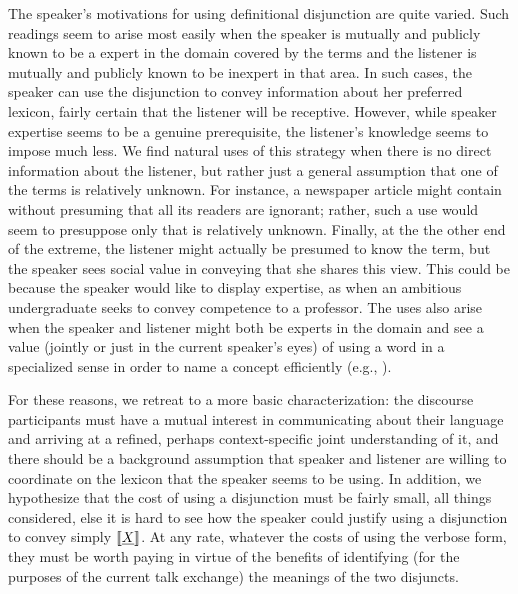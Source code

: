 \documentclass{article}
\begin{document}
The speaker's motivations for using definitional disjunction are quite
varied. Such readings seem to arise most easily when the speaker is
mutually and publicly known to be a expert in the domain covered by
the terms and the listener is mutually and publicly known to be
inexpert in that area. In such cases, the speaker can use the
disjunction to convey information about her preferred lexicon, fairly
certain that the listener will be receptive. However, while speaker
expertise seems to be a genuine prerequisite, the listener's knowledge
seems to impose much less.  We find natural uses of this strategy when
there is no direct information about the listener, but rather just a
general assumption that one of the terms is relatively unknown. For
instance, a newspaper article might contain  without presuming that all its readers are ignorant;
rather, such a use would seem to presuppose only that 
is relatively unknown.  Finally, at the the other end of the extreme,
the listener might actually be presumed to know the term, but the
speaker sees social value in conveying that she shares this view. This
could be because the speaker would like to display expertise, as when
an ambitious undergraduate seeks to convey competence to a professor.
The uses also arise when the speaker and listener might both be
experts in the domain and see a value (jointly or just in the current
speaker's eyes) of using a word in a specialized sense in order to
name a concept efficiently (e.g., ).

For these reasons, we retreat to a more basic characterization: the
discourse participants must have a mutual interest in communicating
about their language and arriving at a refined, perhaps
context-specific joint understanding of it, and there should be a
background assumption that speaker and listener are willing to
coordinate on the lexicon that the speaker seems to be using. In
addition, we hypothesize that the cost of using a disjunction must be
fairly small, all things considered, else it is hard to see how the
speaker could justify using a disjunction  to convey
simply $\llbracket\emph{X}\rrbracket$. At any rate, whatever the costs of using the
verbose form, they must be worth paying in virtue of the benefits of
identifying (for the purposes of the current talk exchange) the
meanings of the two disjuncts.

\end{document}
